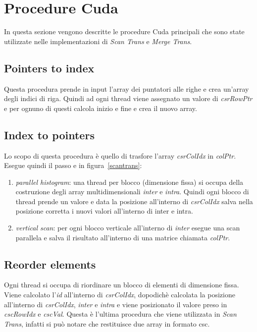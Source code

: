 \documentclass[]{IEEEtran}
\newcommand*\circled[1]{\tikz[baseline=(char.base)]{\node[shape=circle,draw,inner sep=2pt] (char) {#1};}}
\begin{document}
\section{Procedure Cuda}
\label{procedure}

	In questa sezione vengono descritte le procedure Cuda principali che sono state utilizzate nelle implementazioni di \textit{Scan Trans} e \textit{Merge Trans}.

	\subsection{Pointers to index}
	\label{pnt-to-idx}
	Questa procedura prende in input l'array dei puntatori alle righe e crea un'array degli indici di riga. Quindi ad ogni thread viene assegnato un valore di \textit{csrRowPtr} e per ognuno di questi calcola inizio e fine e crea il nuovo array.
	
	
	
	\subsection{Index to pointers}
	\label{idx-to-pnt}
	Lo scopo di questa procedura è quello di trasfore l'array \textit{csrColIdx} in \textit{colPtr}. Esegue quindi il passo \circled{1} e \circled{2} in figura~\ref{scantrans}:
	\begin{enumerate}
		\item \textit{parallel histogram}: una thread per blocco (dimensione fissa) si occupa della costruzione degli array multidimensionali \textit{inter} e \textit{intra}. Quindi ogni blocco di thread prende un valore e data la posizione all'interno di \textit{csrColIdx} salva nella posizione corretta i nuovi valori all'interno di inter e intra.
		\item \textit{vertical scan}: per ogni blocco verticale all'interno di \textit{inter} esegue una scan parallela e salva il risultato all'interno di una matrice chiamata \textit{colPtr}.
	\end{enumerate}


	\subsection{Reorder elements}
	\label{reoder-elem}
	Ogni thread si occupa di riordinare un blocco di elementi di dimensione fissa. Viene calcolato l'\textit{id} all'interno di \textit{csrColIdx}, dopodichè calcolata la posizione all'interno di \textit{csrColIdx}, \textit{inter} e \textit{intra} e viene posizionato il valore preso in \textit{cscRowIdx} e \textit{cscVal}. 
	Questa è l'ultima procedura che viene utilizzata in \textit{Scan Trans}, infatti si può notare che restituisce due array in formato csc.
\end{document}

